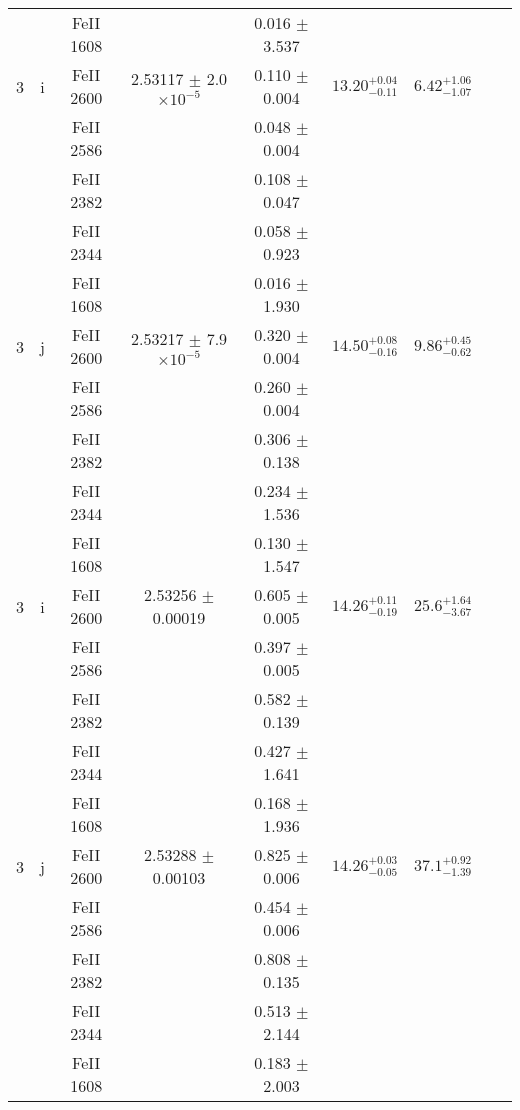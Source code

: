 \documentclass[12pt]{article}
\begin{document}
\begin{footnotesize}
\begin{longtable}{ c c c c c c c c c}
  &   & FeII     1608  &  &  0.016 $\pm$ 3.537   &   &     & 	 & \\ 
       3  & i  & FeII     2600  &  2.53117 $\pm$ 2.0 $\times 10^{-5}$   &  0.110 $\pm$ 0.004   & $13.20_{ - 0.11}^{ + 0.04}$  & $6.42_{ - 1.07}^{ + 1.06}$    & 	 & \\ 
  &   & FeII     2586  &  &  0.048 $\pm$ 0.004   &   &     & 	 & \\ 
  &   & FeII     2382  &  &  0.108 $\pm$ 0.047   &   &     & 	 & \\ 
  &   & FeII     2344  &  &  0.058 $\pm$ 0.923   &   &     & 	 & \\ 
  &   & FeII     1608  &  &  0.016 $\pm$ 1.930   &   &     & 	 & \\ 
       3  & j  & FeII     2600  &  2.53217 $\pm$ 7.9 $\times 10^{-5}$   &  0.320 $\pm$ 0.004   & $14.50_{ - 0.16}^{ + 0.08}$  & $9.86_{ - 0.62}^{ + 0.45}$    & 	 & \\ 
  &   & FeII     2586  &  &  0.260 $\pm$ 0.004   &   &     & 	 & \\ 
  &   & FeII     2382  &  &  0.306 $\pm$ 0.138   &   &     & 	 & \\ 
  &   & FeII     2344  &  &  0.234 $\pm$ 1.536   &   &     & 	 & \\ 
  &   & FeII     1608  &  &  0.130 $\pm$ 1.547   &   &     & 	 & \\ 
       3  & i  & FeII     2600  &  2.53256 $\pm$ 0.00019  &  0.605 $\pm$ 0.005   & $14.26_{ - 0.19}^{ + 0.11}$  & $25.6_{ - 3.67}^{ + 1.64}$    & 	 & \\ 
  &   & FeII     2586  &  &  0.397 $\pm$ 0.005   &   &     & 	 & \\ 
  &   & FeII     2382  &  &  0.582 $\pm$ 0.139   &   &     & 	 & \\ 
  &   & FeII     2344  &  &  0.427 $\pm$ 1.641   &   &     & 	 & \\ 
  &   & FeII     1608  &  &  0.168 $\pm$ 1.936   &   &     & 	 & \\ 
       3  & j  & FeII     2600  &  2.53288 $\pm$ 0.00103  &  0.825 $\pm$ 0.006   & $14.26_{ - 0.05}^{ + 0.03}$  & $37.1_{ - 1.39}^{ + 0.92}$    & 	 & \\ 
  &   & FeII     2586  &  &  0.454 $\pm$ 0.006   &   &     & 	 & \\ 
  &   & FeII     2382  &  &  0.808 $\pm$ 0.135   &   &     & 	 & \\ 
  &   & FeII     2344  &  &  0.513 $\pm$ 2.144   &   &     & 	 & \\ 
  &   & FeII     1608  &  &  0.183 $\pm$ 2.003   &   &     & 	 & \\ 

\end{longtable}
\end{footnotesize}
\end{document}
